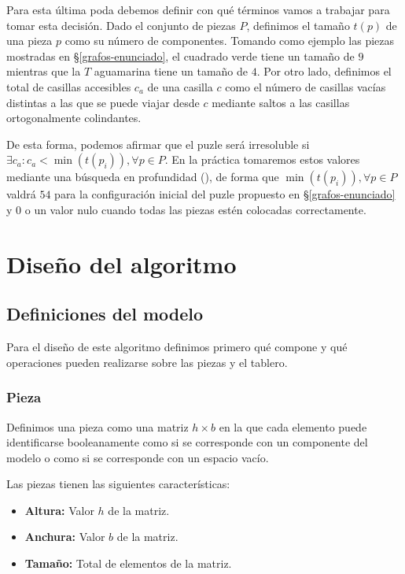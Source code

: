 Para esta última poda debemos definir con qué términos vamos a trabajar para tomar esta decisión.
Dado el conjunto de piezas $P$, definimos el tamaño $t(p)$ de una pieza $p$ como su número de componentes.
Tomando como ejemplo las piezas mostradas en \S\ref{grafos-enunciado}, el cuadrado verde tiene un tamaño de $9$ mientras que la $T$ aguamarina tiene un tamaño de $4$.
Por otro lado, definimos el total de casillas accesibles $c_a$ de una casilla $c$ como el número de casillas vacías distintas a las que se puede viajar desde $c$ mediante saltos a las casillas ortogonalmente colindantes.

De esta forma, podemos afirmar que el puzle será irresoluble si $\exists c_a:c_a<\min(t(p_i)),\forall p\in P$.
En la práctica tomaremos estos valores mediante una búsqueda en profundidad (), de forma que $\min(t(p_i)),\forall p\in P$ valdrá $54$ para la configuración inicial del puzle propuesto en \S\ref{grafos-enunciado} y $0$ o un valor nulo cuando todas las piezas estén colocadas correctamente.

\section{Diseño del algoritmo}\label{grafos-algoritmo}

\subsection{Definiciones del modelo}\label{grafos-algoritmo-definiciones}

Para el diseño de este algoritmo definimos primero qué compone y qué operaciones pueden realizarse sobre las piezas y el tablero.

\subsubsection{Pieza}\label{grafos-algoritmo-definiciones-pieza}

Definimos una pieza como una matriz $h\times b$ en la que cada elemento puede identificarse booleanamente como  si se corresponde con un componente del modelo o como  si se corresponde con un espacio vacío.

Las piezas tienen las siguientes características:

\begin{itemize}
	\item\textbf{Altura:} Valor $h$ de la matriz.
	\item\textbf{Anchura:} Valor $b$ de la matriz.
	\item\textbf{Tamaño:} Total de elementos  de la matriz.
\end{itemize}

